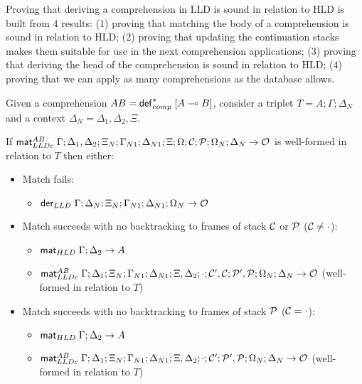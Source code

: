 
Proving that deriving a comprehension in LLD is sound in relation to HLD is
built from 4 results: (1) proving that matching the body of a comprehension is
sound in relation to HLD; (2) proving that updating the continuation stacks
makes them suitable for use in the next comprehension applications; (3) proving
that deriving the head of the comprehension is sound in relation to HLD; (4)
proving that we can apply as many comprehensions as the database allows.

\begin{lemma}\label{thm:comprehension_body_match}
Given a comprehension $AB = \mathsf{def}_{comp}^{*} \; [A \multimap B]$, consider a triplet $T = A; \Gamma;
\Delta_{N}$ and a context $\Delta_{N} = \Delta_1, \Delta_2, \Xi$.

If $\mathsf{mat}_{LLDc}^{AB} \; \Gamma; \Delta_1, \Delta_2; \Xi_N; \Gamma_{N1}; \Delta_{N1}; \Xi;
\Omega; \mathcal{C}; \mathcal{P}; \Omega_N; \Delta_N \rightarrow \mathcal{O}$ is
well-formed in relation to $T$ then either:

\begin{itemize}[leftmargin=*]
   \item Match fails:
   \begin{itemize}[leftmargin=\secondm]
      \item $\mathsf{der}_{LLD} \; \Gamma; \Delta_N; \Xi_N; \Gamma_{N1}; \Delta_{N1}; \Omega_N \rightarrow \mathcal{O}$
   \end{itemize}
   
   \item Match succeeds with no backtracking to frames of stack $\mathcal{C}$ or
   $\mathcal{P}$ ($\mathcal{C} \neq \cdot$):

   \begin{itemize}[leftmargin=\secondm]
      \item $\mathsf{mat}_{HLD} \; \Gamma; \Delta_2 \rightarrow A$
      \item $\mathsf{mat}_{LLDc}^{AB} \; \Gamma; \Delta_1; \Xi_N; \Gamma_{N1}; \Delta_{N1}; \Xi,
         \Delta_2; \cdot; \mathcal{C'}, \mathcal{C}; \mathcal{P'}, \mathcal{P}; \Omega_N; \Delta_N
         \rightarrow \mathcal{O}$ (well-formed in relation to $T$)
   \end{itemize}

   \item Match succeeds with no backtracking to frames of stack $\mathcal{P}$ ($\mathcal{C} =
         \cdot$):
   \begin{itemize}[leftmargin=\secondm]
      \item $\mathsf{mat}_{HLD} \; \Gamma; \Delta_2 \rightarrow A$
      \item $\mathsf{mat}_{LLDc}^{AB} \; \Gamma; \Delta_1; \Xi_N; \Gamma_{N1}; \Delta_{N1}; \Xi,
         \Delta_2; \cdot; \mathcal{C'}; \mathcal{P'}, \mathcal{P}; \Omega_N; \Delta_N
         \rightarrow \mathcal{O}$ (well-formed in relation to $T$)
   \end{itemize}


\end{itemize}
\end{lemma}
